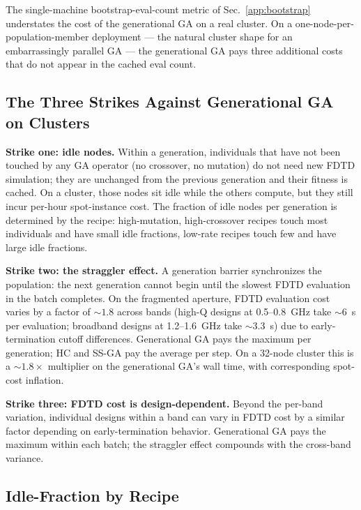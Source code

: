 The single-machine bootstrap-eval-count metric of
Sec.~\ref{app:bootstrap} understates the cost of the generational
GA on a real cluster. On a one-node-per-population-member
deployment --- the natural cluster shape for an embarrassingly
parallel GA --- the generational GA pays three additional costs
that do not appear in the cached eval count.

\subsection{The Three Strikes Against Generational GA on Clusters}

\textbf{Strike one: idle nodes.} Within a generation, individuals
that have not been touched by any GA operator (no crossover, no
mutation) do not need new FDTD simulation; they are unchanged from
the previous generation and their fitness is cached. On a cluster,
those nodes sit idle while the others compute, but they still
incur per-hour spot-instance cost. The fraction of idle nodes per
generation is determined by the recipe: high-mutation,
high-crossover recipes touch most individuals and have small idle
fractions, low-rate recipes touch few and have large idle
fractions.

\textbf{Strike two: the straggler effect.} A generation barrier
synchronizes the population: the next generation cannot begin until
the slowest FDTD evaluation in the batch completes. On the
fragmented aperture, FDTD evaluation cost varies by a factor of
$\sim\!1.8$ across bands (high-Q designs at 0.5--0.8~GHz take
$\sim\!6$~s per evaluation; broadband designs at 1.2--1.6~GHz take
$\sim\!3.3$~s) due to early-termination cutoff differences.
Generational GA pays the maximum per generation; HC and SS-GA pay
the average per step. On a 32-node cluster this is a $\sim\!1.8\times$
multiplier on the generational GA's wall time, with corresponding
spot-cost inflation.

\textbf{Strike three: FDTD cost is design-dependent.} Beyond the
per-band variation, individual designs within a band can vary in
FDTD cost by a similar factor depending on early-termination
behavior. Generational GA pays the maximum within each batch; the
straggler effect compounds with the cross-band variance.

\subsection{Idle-Fraction by Recipe}

